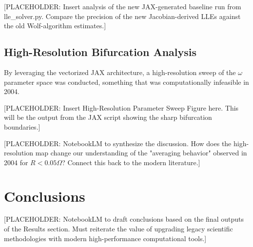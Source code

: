 \documentclass[11pt, a4paper]{article}
\begin{document}
[PLACEHOLDER: Insert analysis of the new JAX-generated baseline run from lle\_solver.py. Compare the precision of the new Jacobian-derived LLEs against the old Wolf-algorithm estimates.]

\subsection{High-Resolution Bifurcation Analysis}
By leveraging the vectorized JAX architecture, a high-resolution sweep of the $\omega$ parameter space was conducted, something that was computationally infeasible in 2004.

[PLACEHOLDER: Insert High-Resolution Parameter Sweep Figure here. This will be the output from the JAX script showing the sharp bifurcation boundaries.]

[PLACEHOLDER: NotebookLM to synthesize the discussion. How does the high-resolution map change our understanding of the "averaging behavior" observed in 2004 for $R < 0.05\Omega$? Connect this back to the modern literature.]

\section{Conclusions}
\label{sec:conclusions}
[PLACEHOLDER: NotebookLM to draft conclusions based on the final outputs of the Results section. Must reiterate the value of upgrading legacy scientific methodologies with modern high-performance computational tools.]
\end{document}
